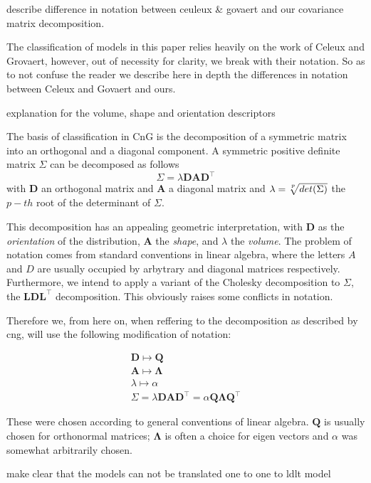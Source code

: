 describe difference in notation between ceuleux \& govaert and our covariance matrix decomposition.

The classification of models in this paper relies heavily on the work of Celeux and Grovaert,
however, out of necessity for clarity, we break with their notation. 
So as to not confuse the reader we describe here in depth the differences in notation
between Celeux and Govaert and ours.

explanation for the volume, shape and orientation descriptors

The basis of classification in CnG is the decomposition of a symmetric matrix into
an orthogonal and a diagonal component.
A symmetric positive definite matrix $ \Sigma $ can be decomposed as follows
\[ \Sigma = \lambda \pmb{D} \pmb{A} \pmb{D}^{\top} \]
with $ \pmb{D} $ an orthogonal matrix and $ \pmb{A} $ a diagonal matrix and 
$ \lambda = \sqrt[\uproot{3}p]{det(\Sigma)} $ the $ p-th $ root of the determinant 
of $ \Sigma $.

This decomposition has an appealing geometric interpretation, with $ \pmb{D} $ 
as the \textit{orientation} of the distribution, $ \pmb{A} $ the \textit{shape}, and $ \lambda $
the \textit{volume}.
The problem of notation comes from standard conventions in linear algebra, where
the letters $A$ and $D$ are usually occupied by arbytrary and diagonal matrices 
respectively. Furthermore, we intend to apply a variant of the Cholesky decomposition
to $ \Sigma $, the $ \pmb{L}\pmb{D}\pmb{L}^{\top} $ decomposition.
This obviously raises some conflicts in notation.

Therefore we, from here on, when reffering to the decomposition as described
by cng, will use the following modification of notation:

\begin{align*} 
    \pmb{D} \longmapsto \pmb{Q} \\
    \pmb{A} \longmapsto \pmb{\Lambda} \\
    \lambda \longmapsto \alpha  \\
    \Sigma = \lambda \pmb{D} \pmb{A} \pmb{D}^{\top} =
        \alpha \pmb{Q} \pmb{\Lambda} \pmb{Q}^{\top}
\end{align*}

These were chosen according to general conventions of linear algebra.
$ \pmb{Q} $ is usually chosen for orthonormal matrices; $ \pmb{\Lambda} $ is 
often a choice for eigen vectors and $ \alpha $ was somewhat arbitrarily chosen.


make clear that the models can not be translated one to one to ldlt model

